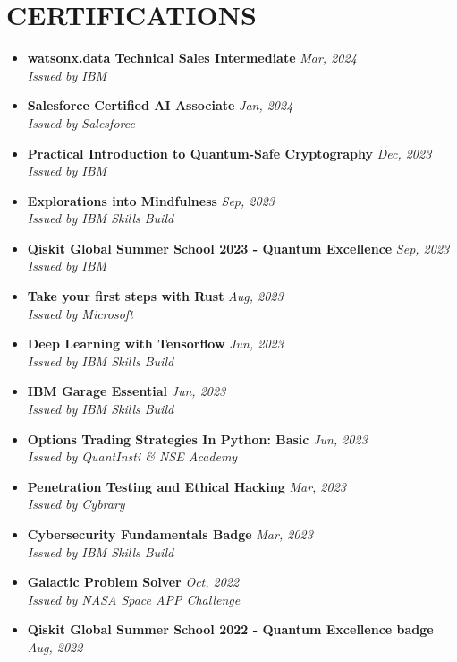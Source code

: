 \documentclass[12pt]{my_cv}
\begin{document}
\section{CERTIFICATIONS}
\begin{itemize}
\item \textbf{watsonx.data Technical Sales Intermediate} \hfill \textit{Mar, 2024}
\\ \textit{Issued by IBM}
\item \textbf{
Salesforce Certified AI Associate} \hfill \textit{Jan, 2024}
\\ \textit{Issued by Salesforce}
\item \textbf{Practical Introduction to Quantum-Safe Cryptography} \hfill \textit{Dec, 2023}
\\ \textit{Issued by IBM}
\item \textbf{Explorations into Mindfulness} \hfill \textit{Sep, 2023}
\\ \textit{Issued by IBM Skills Build}
\item \textbf{Qiskit Global Summer School 2023 - Quantum Excellence} \hfill \textit{Sep, 2023}
\\ \textit{Issued by IBM}
\item \textbf{Take your first steps with Rust} \hfill \textit{Aug, 2023}
\\ \textit{Issued by Microsoft}
\item \textbf{Deep Learning with Tensorflow} \hfill \textit{Jun, 2023}
\\ \textit{Issued by IBM Skills Build}
\item \textbf{IBM Garage Essential} \hfill \textit{Jun, 2023}
\\ \textit{Issued by IBM Skills Build}
\item \textbf{Options Trading Strategies In Python: Basic} \hfill \textit{Jun, 2023}
\\ \textit{Issued by QuantInsti \& NSE Academy }
\item \textbf{Penetration Testing and Ethical Hacking} \hfill \textit{Mar, 2023}
\\ \textit{Issued by Cybrary}
\item \textbf{Cybersecurity Fundamentals Badge} \hfill \textit{Mar, 2023}
\\ \textit{Issued by IBM Skills Build}
\item \textbf{Galactic Problem Solver} \hfill \textit{Oct, 2022}
\\ \textit{Issued by NASA Space APP Challenge}
\item \textbf{Qiskit Global Summer School 2022 - Quantum Excellence badge} \hfill \textit{Aug, 2022}

\end{itemize}
\end{document}
